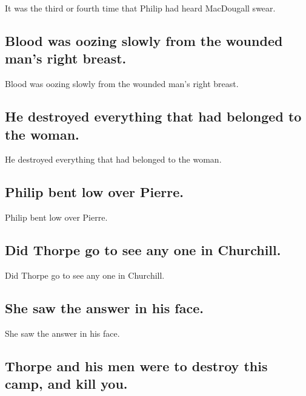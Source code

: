\documentclass[]{article}
\begin{document}
It was the third or fourth time that Philip had heard MacDougall swear.

\hypertarget{blood-was-oozing-slowly-from-the-wounded-mans-right-breast.}{%
\subsection{Blood was oozing slowly from the wounded man's right
breast.}\label{blood-was-oozing-slowly-from-the-wounded-mans-right-breast.}}

Blood was oozing slowly from the wounded man's right breast.

\hypertarget{he-destroyed-everything-that-had-belonged-to-the-woman.}{%
\subsection{He destroyed everything that had belonged to the
woman.}\label{he-destroyed-everything-that-had-belonged-to-the-woman.}}

He destroyed everything that had belonged to the woman.

\hypertarget{philip-bent-low-over-pierre.}{%
\subsection{Philip bent low over
Pierre.}\label{philip-bent-low-over-pierre.}}

Philip bent low over Pierre.

\hypertarget{did-thorpe-go-to-see-any-one-in-churchill.}{%
\subsection{Did Thorpe go to see any one in
Churchill.}\label{did-thorpe-go-to-see-any-one-in-churchill.}}

Did Thorpe go to see any one in Churchill.

\hypertarget{she-saw-the-answer-in-his-face.}{%
\subsection{She saw the answer in his
face.}\label{she-saw-the-answer-in-his-face.}}

She saw the answer in his face.

\hypertarget{thorpe-and-his-men-were-to-destroy-this-camp-and-kill-you.}{%
\subsection{Thorpe and his men were to destroy this camp, and kill
you.}\label{thorpe-and-his-men-were-to-destroy-this-camp-and-kill-you.}}
\end{document}
